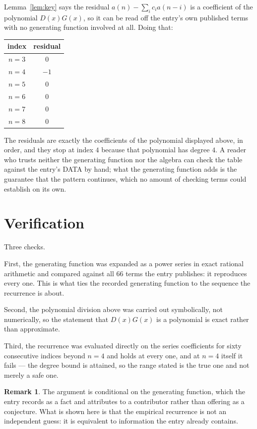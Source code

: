 \documentclass[11pt,a4paper]{article}
\theoremstyle{plain}
\theoremstyle{definition}
\newtheorem{remark}[theorem]{Remark}
\begin{document}
Lemma~\ref{lem:key} says the residual $a(n)-\sum_ic_ia(n-i)$ is a coefficient of the
polynomial $D(x)G(x)$, so it can be read off the entry's own published terms with no
generating function involved at all. Doing that:
\begin{center}
\begin{tabular}{cc}
index & residual \\ \hline
$n=3$ & $0$ \\
$n=4$ & $-1$ \\
$n=5$ & $0$ \\
$n=6$ & $0$ \\
$n=7$ & $0$ \\
$n=8$ & $0$
\end{tabular}
\end{center}
The residuals are exactly the coefficients of the polynomial displayed above, in order, and
they stop at index $4$ because that polynomial has degree $4$. A reader who trusts
neither the generating function nor the algebra can check the table against the entry's DATA
by hand; what the generating function adds is the guarantee that the pattern continues, which
no amount of checking terms could establish on its own.

\section{Verification}

Three checks.

First, the generating function was expanded as a power series in exact rational arithmetic and
compared against all $66$ terms the entry publishes: it reproduces every one. This is
what ties the recorded generating function to the sequence the recurrence is about.

Second, the polynomial division above was carried out symbolically, not numerically, so the
statement that $D(x)G(x)$ is a polynomial is exact rather than approximate.

Third, the recurrence was evaluated directly on the series coefficients for sixty consecutive
indices beyond $n=4$ and holds at every one, and at $n=4$ itself it fails --- the
degree bound is attained, so the range stated is the true one and not merely a safe one.

\begin{remark}
The argument is conditional on the generating function, which the entry records as a fact and
attributes to a contributor rather than offering as a conjecture. What is shown here is that
the empirical recurrence is not an independent guess: it is equivalent to information the
entry already contains.
\end{remark}
\end{document}
